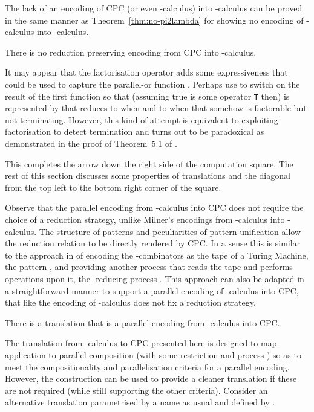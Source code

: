 \documentclass{llncs}
\begin{document}
The lack of an encoding of CPC (or even -calculus) into -calculus can be
proved in the same manner as Theorem~\ref{thm:no-pi2lambda} for showing no encoding
of -calculus into -calculus.

\begin{theorem}
\label{thm:noCPC2SF}
There is no reduction preserving encoding from CPC into -calculus.
\end{theorem}


It may appear that the factorisation operator  adds some expressiveness that could
be used to capture the parallel-or function .
Perhaps use  to switch on the result of the first function so that (assuming true
is some operator {\tt T} then)  is represented by  that reduces to
 when  and to  when  that somehow is factorable but
not terminating.
However, this kind of attempt is equivalent to exploiting factorisation to detect termination 
and turns out to be paradoxical as demonstrated in the proof of Theorem~5.1 of \cite{JayGW11}.




This completes the arrow down the right side of the computation square. The rest of this section discusses some properties of translations and the diagonal from the top left to the bottom right corner of the square.

\medskip

Observe that the parallel encoding from -calculus into CPC does not require the choice of a reduction strategy, unlike Milner's encodings from -calculus into -calculus.
The structure of patterns and peculiarities of pattern-unification allow the reduction relation to be directly rendered by CPC.
In a sense this is similar to the approach in \cite{givenwilson:hal-00987594} of encoding the -combinators as the tape
of a Turing Machine, the pattern ,
and providing another process that reads the tape and performs operations upon it, the -reducing process
.
This approach can also be adapted in a straightforward manner to support a parallel encoding of
-calculus into CPC, that like the encoding of -calculus does not fix a reduction strategy.

\begin{theorem}
\label{thm:SK2CPC}
There is a translation  that is a parallel encoding from -calculus into CPC.
\end{theorem}


The translation from -calculus to CPC presented here is designed to map application to 
parallel composition (with some restriction and process ) so as to meet the
compositionality
and parallelisation
criteria for a parallel encoding.
However, the construction  can be used to provide a cleaner translation if 
these are not required
(while still supporting the other criteria).
Consider an alternative translation  parametrised by a name  as usual and defined by
.
\end{document}
